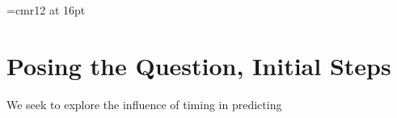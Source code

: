 \documentclass{article}
\begin{document}
\font\myfont=cmr12 at 16pt
\maketitle



\section{Posing the Question, Initial Steps}

We seek to explore the influence of timing in predicting
\end{document}
